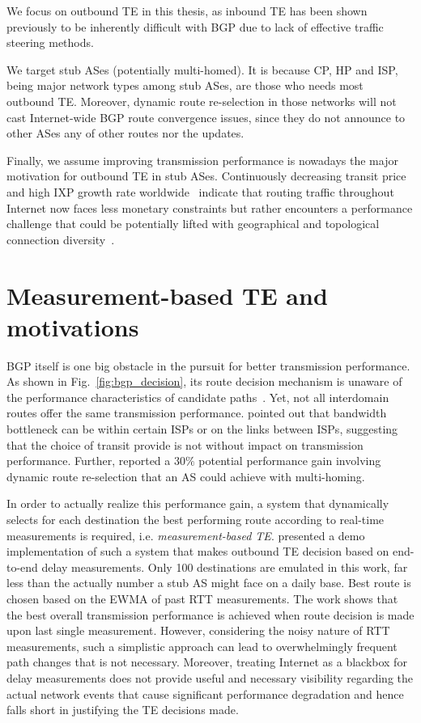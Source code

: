 We focus on outbound TE in this thesis, as inbound TE has been shown previously to be inherently difficult with BGP due to lack of effective traffic steering methods.

We target stub ASes (potentially multi-homed).
It is because \ac{CP}, \ac{HP} and \ac{ISP}, being major network types among stub ASes, are those who needs most outbound TE.
Moreover, dynamic route re-selection in those networks will not cast Internet-wide BGP route convergence issues, since they do not announce to other ASes any of other routes nor the updates.

Finally, we assume improving transmission performance is nowadays the major motivation for outbound TE in stub ASes.
Continuously decreasing transit price~\cite{transitprice, drpeering} and high \ac{IXP} growth rate worldwide~\cite{pchixp} indicate that routing traffic throughout Internet now faces less monetary constraints but rather encounters a performance challenge that could be potentially lifted with geographical and topological connection diversity~\cite{Chiu2015}.


\section{Measurement-based TE and motivations}

BGP itself is one big obstacle in the pursuit for better transmission performance.
As shown in Fig.~\ref{fig:bgp_decision}, its route decision mechanism is unaware of the performance characteristics of candidate paths~\cite{Yannuzzi2005}.
Yet, not all interdomain routes offer the same transmission performance. \citet{Akella2003} pointed out that bandwidth bottleneck can be within certain \acp{ISP} or on the links between \acp{ISP}, suggesting that the choice of transit provide is not without impact on transmission performance.
Further, \citet{Akella2003a} reported a $30\%$ potential performance gain involving dynamic route re-selection that an AS could achieve with multi-homing.

In order to actually realize this performance gain, a system that dynamically selects for each destination the best performing route according to real-time measurements is required, i.e. \textit{measurement-based TE}.
\citet{Akella2008} presented a demo implementation of such a system that makes outbound TE decision based on end-to-end delay measurements. Only 100 destinations are emulated in this work, far less than the actually number a stub AS might face on a daily base. Best route is chosen based on the \ac{EWMA} of past \acf{RTT} measurements. The work shows that the best overall transmission performance is achieved when route decision is made upon last single measurement. However, considering the noisy nature of \ac{RTT} measurements, such a simplistic approach can lead to overwhelmingly frequent path changes that is not necessary. Moreover, treating Internet as a blackbox for delay measurements does not provide useful and necessary visibility regarding the actual network events that cause significant performance degradation and hence falls short in justifying the TE decisions made. 


